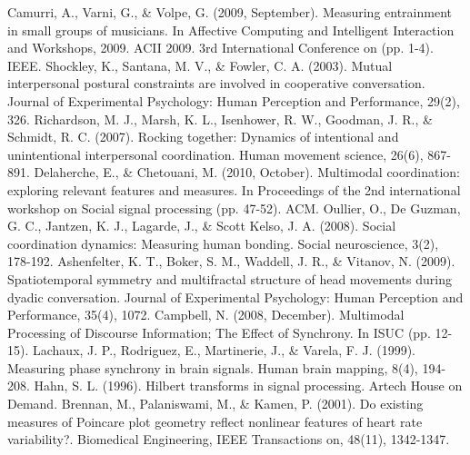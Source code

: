 \documentclass[12pt]{article}
\begin{document}
\begin{thebibliography}{}
    Camurri, A., Varni, G., \& Volpe, G. (2009, September). Measuring entrainment in small groups of musicians. In Affective Computing and Intelligent Interaction and Workshops, 2009. ACII 2009. 3rd International Conference on (pp. 1-4). IEEE.
    Shockley, K., Santana, M. V., \& Fowler, C. A. (2003). Mutual interpersonal postural constraints are involved in cooperative conversation. Journal of Experimental Psychology: Human Perception and Performance, 29(2), 326.
    Richardson, M. J., Marsh, K. L., Isenhower, R. W., Goodman, J. R., \& Schmidt, R. C. (2007). Rocking together: Dynamics of intentional and unintentional interpersonal coordination. Human movement science, 26(6), 867-891.
    Delaherche, E., \& Chetouani, M. (2010, October). Multimodal coordination: exploring relevant features and measures. In Proceedings of the 2nd international workshop on Social signal processing (pp. 47-52). ACM.
    Oullier, O., De Guzman, G. C., Jantzen, K. J., Lagarde, J., \& Scott Kelso, J. A. (2008). Social coordination dynamics: Measuring human bonding. Social neuroscience, 3(2), 178-192.
    Ashenfelter, K. T., Boker, S. M., Waddell, J. R., \& Vitanov, N. (2009). Spatiotemporal symmetry and multifractal structure of head movements during dyadic conversation. Journal of Experimental Psychology: Human Perception and Performance, 35(4), 1072.
    Campbell, N. (2008, December). Multimodal Processing of Discourse Information; The Effect of Synchrony. In ISUC (pp. 12-15).
    Lachaux, J. P., Rodriguez, E., Martinerie, J., \& Varela, F. J. (1999). Measuring phase synchrony in brain signals. Human brain mapping, 8(4), 194-208.
    Hahn, S. L. (1996). Hilbert transforms in signal processing. Artech House on Demand.
    Brennan, M., Palaniswami, M., \& Kamen, P. (2001). Do existing measures of Poincare plot geometry reflect nonlinear features of heart rate variability?. Biomedical Engineering, IEEE Transactions on, 48(11), 1342-1347.
\end{thebibliography}
\end{document}
